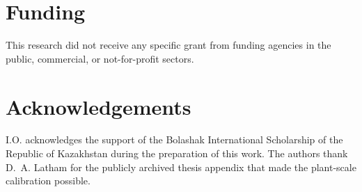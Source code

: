 \documentclass[final,3p,times]{elsarticle}
\begin{document}
\section*{Funding}
This research did not receive any specific grant from funding agencies in the public, commercial, or not-for-profit sectors.

\section*{Acknowledgements}
I.O. acknowledges the support of the Bolashak International Scholarship of the Republic of Kazakhstan during the preparation of this work. The authors thank D.~A. Latham for the publicly archived thesis appendix that made the plant-scale calibration possible.

\end{document}
